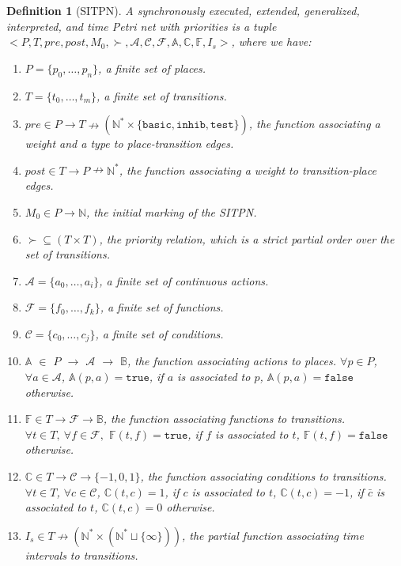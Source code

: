 \documentclass[pdflatex,sn-mathphys]{sn-jnl}%
\theoremstyle{thmstyleone}%
\theoremstyle{thmstyletwo}%
\theoremstyle{thmstylethree}%
\newtheorem{definition}{Definition}%
\begin{document}
\begin{definition}[SITPN]
  \label{def:sitpn}
  A synchronously executed, extended, generalized, interpreted, and
  time Petri net with priorities is a tuple
  ${<}P,T,pre,post,M_0,{\succ},\mathcal{A},\mathcal{C},\mathcal{F},
  \mathbb{A},\mathbb{C},\mathbb{F},{I_s}{>}$, where we have:
  \begin{enumerate}
  \item $P=\{p_0,\ldots,p_n\}$, a finite set of places.
  \item $T=\{t_0,\ldots,t_m\}$, a finite set of transitions.
  \item
    $pre\in{}P\rightarrow{}T\nrightarrow(\mathbb{N}^{*}\times\{\mathtt{basic},\mathtt{inhib},\mathtt{test}\})$,
    the function associating a weight and a type to place-transition
    edges.
  \item $post\in{}T\rightarrow{}P\nrightarrow\mathbb{N}^{*}$, the
    function associating a weight to transition-place edges.
  \item $M_0\in{}P\rightarrow\mathbb{N}$, the initial marking of the SITPN.
  \item $\succ\subseteq{}(T\times{}T)$, the priority relation, which
    is a strict partial order over the set of transitions.
  \item $\mathcal{A}=\{a_0,\ldots,a_i\}$, a finite set of continuous actions.
  \item $\mathcal{F}=\{f_0,\ldots,f_k\}$, a finite set of functions.
  \item $\mathcal{C}=\{c_0,\ldots,c_j\}$, a finite set of conditions.
  \item $\mathbb{A}$ $\in$ ${}P$ $\rightarrow$ $\mathcal{A}$
    $\rightarrow$ $\mathbb{B}$, the function associating actions to
    places.  $\forall{}p\in{}P$, $\forall{}a\in\mathcal{A}$,
    $\mathbb{A}(p,a)=\mathtt{true}$, if $a$ is associated to $p$,
    $\mathbb{A}(p,a)=\mathtt{false}$ otherwise.
  \item $\mathbb{F}\in{}T\rightarrow\mathcal{F}\rightarrow\mathbb{B}$,
    the function associating functions to transitions.
    $\forall{}t\in{}T,~\forall{}f\in\mathcal{F},$
    $\mathbb{F}(t,f)=\mathtt{true}$, if $f$ is associated to $t$,
    $\mathbb{F}(t,f)=\mathtt{false}$ otherwise.
    
  \item $\mathbb{C} \in T \rightarrow \mathcal{C} \rightarrow\{-1,0,1\}$, the
    function associating conditions to transitions.
    $\forall t \in T$, $\forall c \in \mathcal{C}$,
    $\mathbb{C}(t,c)=1$, if $c$ is associated to $t$,
    $\mathbb{C}(t,c)=-1$, if $\bar{c}$ is associated to $t$,
    $\mathbb{C}(t,c)=0$ otherwise.
  \item
    $I_s\in{}T\nrightarrow(\mathbb{N}^{*}\times(\mathbb{N^{*}}\sqcup\{\infty\}))$,
    the partial function associating time intervals to transitions.
  \end{enumerate}
\end{definition}
\end{document}
